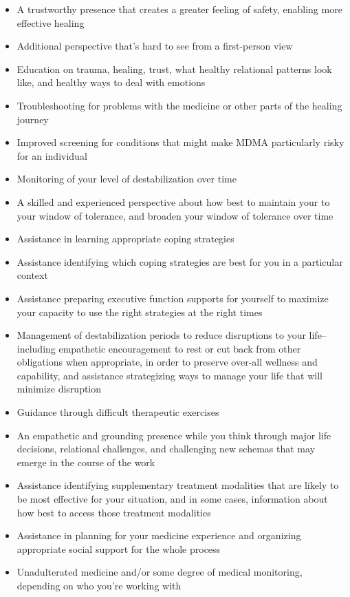 \documentclass[12pt,letterpaper]{book}
\begin{document}
\begin{itemize}
    \item A trustworthy presence that creates a greater feeling of safety, enabling more effective healing
    \item Additional perspective that's hard to see from a first-person view
    \item Education on trauma, healing, trust, what healthy relational patterns look like, and healthy ways to deal with emotions
    \item Troubleshooting for problems with the medicine or other parts of the healing journey
    \item Improved screening for conditions that might make MDMA particularly risky for an individual
    \item Monitoring of your level of destabilization over time
    \item A skilled and experienced perspective about how best to maintain your to your window of tolerance, and broaden your window of tolerance over time
    \item Assistance in learning appropriate coping strategies
    \item Assistance identifying which coping strategies are best for you in a particular context
    \item Assistance preparing executive function supports for yourself to maximize your capacity to use the right strategies at the right times
    \item Management of destabilization periods to reduce disruptions to your life–including empathetic encouragement to rest or cut back from other obligations when appropriate, in order to preserve over-all wellness and capability, and assistance strategizing ways to manage your life that will minimize disruption 
    \item Guidance through difficult therapeutic exercises
    \item An empathetic and grounding presence while you think through major life decisions, relational challenges, and challenging new schemas that may emerge in the course of the work
    \item Assistance identifying supplementary treatment modalities that are likely to be most effective for your situation, and in some cases, information about how best to access those treatment modalities
    \item Assistance in planning for your medicine experience and organizing appropriate social support for the whole process
    \item Unadulterated medicine and/or some degree of medical monitoring, depending on who you're working with
\end{itemize}
\end{document}
